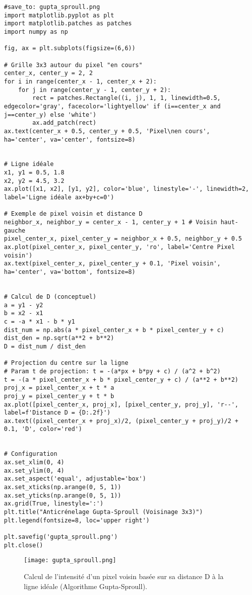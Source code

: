 \documentclass{article}
\begin{document}
\begin{verbatim}
#save_to: gupta_sproull.png
import matplotlib.pyplot as plt
import matplotlib.patches as patches
import numpy as np

fig, ax = plt.subplots(figsize=(6,6))

# Grille 3x3 autour du pixel "en cours"
center_x, center_y = 2, 2
for i in range(center_x - 1, center_x + 2):
    for j in range(center_y - 1, center_y + 2):
        rect = patches.Rectangle((i, j), 1, 1, linewidth=0.5, edgecolor='gray', facecolor='lightyellow' if (i==center_x and j==center_y) else 'white')
        ax.add_patch(rect)
ax.text(center_x + 0.5, center_y + 0.5, 'Pixel\nen cours', ha='center', va='center', fontsize=8)


# Ligne idéale
x1, y1 = 0.5, 1.8
x2, y2 = 4.5, 3.2
ax.plot([x1, x2], [y1, y2], color='blue', linestyle='-', linewidth=2, label='Ligne idéale ax+by+c=0')

# Exemple de pixel voisin et distance D
neighbor_x, neighbor_y = center_x - 1, center_y + 1 # Voisin haut-gauche
pixel_center_x, pixel_center_y = neighbor_x + 0.5, neighbor_y + 0.5
ax.plot(pixel_center_x, pixel_center_y, 'ro', label='Centre Pixel voisin')
ax.text(pixel_center_x, pixel_center_y + 0.1, 'Pixel voisin', ha='center', va='bottom', fontsize=8)


# Calcul de D (conceptuel)
a = y1 - y2
b = x2 - x1
c = -a * x1 - b * y1
dist_num = np.abs(a * pixel_center_x + b * pixel_center_y + c)
dist_den = np.sqrt(a**2 + b**2)
D = dist_num / dist_den

# Projection du centre sur la ligne
# Param t de projection: t = -(a*px + b*py + c) / (a^2 + b^2)
t = -(a * pixel_center_x + b * pixel_center_y + c) / (a**2 + b**2)
proj_x = pixel_center_x + t * a
proj_y = pixel_center_y + t * b
ax.plot([pixel_center_x, proj_x], [pixel_center_y, proj_y], 'r--', label=f'Distance D = {D:.2f}')
ax.text((pixel_center_x + proj_x)/2, (pixel_center_y + proj_y)/2 + 0.1, 'D', color='red')


# Configuration
ax.set_xlim(0, 4)
ax.set_ylim(0, 4)
ax.set_aspect('equal', adjustable='box')
ax.set_xticks(np.arange(0, 5, 1))
ax.set_yticks(np.arange(0, 5, 1))
ax.grid(True, linestyle=':')
plt.title("Anticrénelage Gupta-Sproull (Voisinage 3x3)")
plt.legend(fontsize=8, loc='upper right')

plt.savefig('gupta_sproull.png')
plt.close()
\end{verbatim}

\begin{figure}[H]
\centering
\texttt{[image: gupta\_sproull.png]}
\caption{Calcul de l'intensité d'un pixel voisin basée sur sa distance D à la ligne idéale (Algorithme Gupta-Sproull).}
\label{fig:gupta_sproull}
\end{figure}
\end{document}
